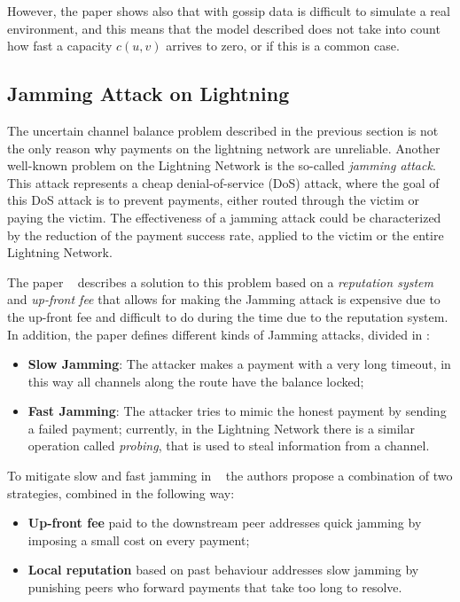However, the paper shows also that with gossip data is difficult to simulate 
a real environment, and this means that the model described does not take into 
count  how fast a capacity $c(u, v)$ arrives to zero, or if this is a 
common case.

\subsection{Jamming Attack on Lightning}\label{sec:jamming}

The uncertain channel balance problem described in the previous section 
is not the only reason why payments on the lightning network are unreliable.
Another well-known problem on the Lightning Network is the so-called \emph{jamming attack}. This attack represents a cheap 
denial-of-service (DoS) attack, where the goal of this DoS attack 
is to prevent payments, either routed through the victim or paying the victim. 
The effectiveness of a jamming attack could be characterized by the reduction of the
payment success rate, applied to the victim or the entire Lightning Network.

The paper ~\cite{cryptoeprint:2022/1454} describes a solution to this problem 
based on a \emph{reputation system} and \emph{up-front fee} that allows for making
the Jamming attack is expensive due to the up-front fee and difficult to do during the time 
due to the reputation system.
In addition, the paper defines different kinds of Jamming attacks, divided in :

\begin{itemize}
    \item {\bf Slow Jamming}: The attacker makes a payment with a very long timeout, 
        in this way all channels along the route have the balance locked;
    \item {\bf Fast Jamming}: The attacker tries to mimic the honest payment by sending
        a failed payment; currently, in the Lightning Network there is a similar operation called \emph{probing},
        that is used to steal information from a channel.
\end{itemize}

To mitigate slow and fast jamming in ~\cite{cryptoeprint:2022/1454} the authors
propose a combination of two strategies, combined in the following way:

\begin{itemize}
    \item {\bf Up-front fee} paid to the downstream peer addresses quick jamming 
        by imposing a small cost on every payment;
    \item {\bf Local reputation} based on past behaviour addresses slow jamming by 
        punishing peers who forward payments that take too long to resolve.
\end{itemize}

